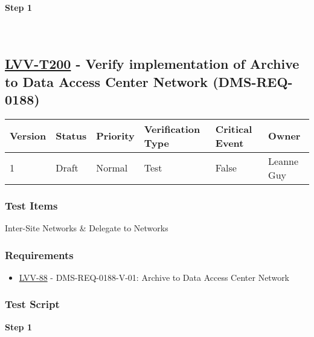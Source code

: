\textbf{Step 1}\\
~\\
~\\

\hypertarget{lvv-t200---verify-implementation-of-archive-to-data-access-center-network-dms-req-0188}{%
\subsection{\texorpdfstring{\href{https://jira.lsstcorp.org/secure/Tests.jspa\#/testCase/LVV-T200}{LVV-T200}
- Verify implementation of Archive to Data Access Center Network
(DMS-REQ-0188)}{LVV-T200 - Verify implementation of Archive to Data Access Center Network (DMS-REQ-0188)}}\label{lvv-t200---verify-implementation-of-archive-to-data-access-center-network-dms-req-0188}}

\begin{longtable}[]{@{}llllll@{}}
\toprule
Version & Status & Priority & Verification Type & Critical Event &
Owner\tabularnewline
\midrule
\endhead
1 & Draft & Normal & Test & False & Leanne Guy\tabularnewline
\bottomrule
\end{longtable}

\hypertarget{test-items-176}{%
\subsubsection{Test Items}\label{test-items-176}}

Inter-Site Networks \& Delegate to Networks

\hypertarget{requirements-177}{%
\subsubsection{Requirements}\label{requirements-177}}

\begin{itemize}
\tightlist
\item
  \href{https://jira.lsstcorp.org/browse/LVV-88}{LVV-88} -
  DMS-REQ-0188-V-01: Archive to Data Access Center Network
\end{itemize}

\hypertarget{test-script-177}{%
\subsubsection{Test Script}\label{test-script-177}}

\textbf{Step 1}\\
~\\
~\\

